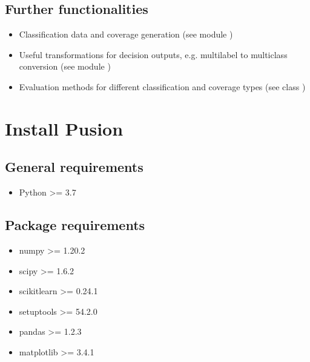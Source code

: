 \documentclass[letterpaper,10pt,english]{sphinxmanual}
\begin{document}
\section{Further functionalities}
\label{\detokenize{overview:further-functionalities}}\begin{itemize}
\item {} 
\sphinxAtStartPar
Classification data and coverage generation (see module {\hyperref[\detokenize{pusion.util.generator:generator-cref}]{}})

\item {} 
\sphinxAtStartPar
Useful transformations for decision outputs, e.g. multilabel to multiclass conversion
(see module {\hyperref[\detokenize{pusion.util.transformer:transformer-cref}]{}})

\item {} 
\sphinxAtStartPar
Evaluation methods for different classification and coverage types (see class {\hyperref[\detokenize{pusion.evaluation.evaluation:eval-cref}]{}})

\end{itemize}


\chapter{Install Pusion}
\label{\detokenize{install:install-pusion}}\label{\detokenize{install::doc}}

\section{General requirements}
\label{\detokenize{install:general-requirements}}\begin{itemize}
\item {} 
\sphinxAtStartPar
Python \textgreater{}= 3.7

\end{itemize}


\section{Package requirements}
\label{\detokenize{install:package-requirements}}\begin{itemize}
\item {} 
\sphinxAtStartPar
numpy \textgreater{}= 1.20.2

\item {} 
\sphinxAtStartPar
scipy \textgreater{}= 1.6.2

\item {} 
\sphinxAtStartPar
scikit\sphinxhyphen{}learn \textgreater{}= 0.24.1

\item {} 
\sphinxAtStartPar
setuptools \textgreater{}= 54.2.0

\item {} 
\sphinxAtStartPar
pandas \textgreater{}= 1.2.3

\item {} 
\sphinxAtStartPar
matplotlib \textgreater{}= 3.4.1

\end{itemize}
\end{document}
